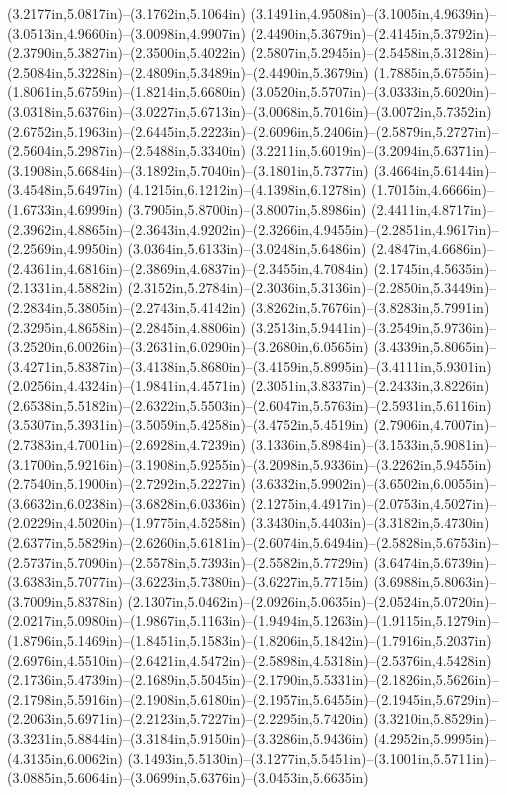 (3.2177in,5.0817in)--(3.1762in,5.1064in) (3.1491in,4.9508in)--(3.1005in,4.9639in)--(3.0513in,4.9660in)--(3.0098in,4.9907in) (2.4490in,5.3679in)--(2.4145in,5.3792in)--(2.3790in,5.3827in)--(2.3500in,5.4022in) (2.5807in,5.2945in)--(2.5458in,5.3128in)--(2.5084in,5.3228in)--(2.4809in,5.3489in)--(2.4490in,5.3679in) (1.7885in,5.6755in)--(1.8061in,5.6759in)--(1.8214in,5.6680in) (3.0520in,5.5707in)--(3.0333in,5.6020in)--(3.0318in,5.6376in)--(3.0227in,5.6713in)--(3.0068in,5.7016in)--(3.0072in,5.7352in) (2.6752in,5.1963in)--(2.6445in,5.2223in)--(2.6096in,5.2406in)--(2.5879in,5.2727in)--(2.5604in,5.2987in)--(2.5488in,5.3340in) (3.2211in,5.6019in)--(3.2094in,5.6371in)--(3.1908in,5.6684in)--(3.1892in,5.7040in)--(3.1801in,5.7377in) (3.4664in,5.6144in)--(3.4548in,5.6497in) (4.1215in,6.1212in)--(4.1398in,6.1278in) (1.7015in,4.6666in)--(1.6733in,4.6999in) (3.7905in,5.8700in)--(3.8007in,5.8986in) (2.4411in,4.8717in)--(2.3962in,4.8865in)--(2.3643in,4.9202in)--(2.3266in,4.9455in)--(2.2851in,4.9617in)--(2.2569in,4.9950in) (3.0364in,5.6133in)--(3.0248in,5.6486in) (2.4847in,4.6686in)--(2.4361in,4.6816in)--(2.3869in,4.6837in)--(2.3455in,4.7084in) (2.1745in,4.5635in)--(2.1331in,4.5882in) (2.3152in,5.2784in)--(2.3036in,5.3136in)--(2.2850in,5.3449in)--(2.2834in,5.3805in)--(2.2743in,5.4142in) (3.8262in,5.7676in)--(3.8283in,5.7991in) (2.3295in,4.8658in)--(2.2845in,4.8806in) (3.2513in,5.9441in)--(3.2549in,5.9736in)--(3.2520in,6.0026in)--(3.2631in,6.0290in)--(3.2680in,6.0565in) (3.4339in,5.8065in)--(3.4271in,5.8387in)--(3.4138in,5.8680in)--(3.4159in,5.8995in)--(3.4111in,5.9301in) (2.0256in,4.4324in)--(1.9841in,4.4571in) (2.3051in,3.8337in)--(2.2433in,3.8226in) (2.6538in,5.5182in)--(2.6322in,5.5503in)--(2.6047in,5.5763in)--(2.5931in,5.6116in) (3.5307in,5.3931in)--(3.5059in,5.4258in)--(3.4752in,5.4519in) (2.7906in,4.7007in)--(2.7383in,4.7001in)--(2.6928in,4.7239in) (3.1336in,5.8984in)--(3.1533in,5.9081in)--(3.1700in,5.9216in)--(3.1908in,5.9255in)--(3.2098in,5.9336in)--(3.2262in,5.9455in) (2.7540in,5.1900in)--(2.7292in,5.2227in) (3.6332in,5.9902in)--(3.6502in,6.0055in)--(3.6632in,6.0238in)--(3.6828in,6.0336in) (2.1275in,4.4917in)--(2.0753in,4.5027in)--(2.0229in,4.5020in)--(1.9775in,4.5258in) (3.3430in,5.4403in)--(3.3182in,5.4730in) (2.6377in,5.5829in)--(2.6260in,5.6181in)--(2.6074in,5.6494in)--(2.5828in,5.6753in)--(2.5737in,5.7090in)--(2.5578in,5.7393in)--(2.5582in,5.7729in) (3.6474in,5.6739in)--(3.6383in,5.7077in)--(3.6223in,5.7380in)--(3.6227in,5.7715in) (3.6988in,5.8063in)--(3.7009in,5.8378in) (2.1307in,5.0462in)--(2.0926in,5.0635in)--(2.0524in,5.0720in)--(2.0217in,5.0980in)--(1.9867in,5.1163in)--(1.9494in,5.1263in)--(1.9115in,5.1279in)--(1.8796in,5.1469in)--(1.8451in,5.1583in)--(1.8206in,5.1842in)--(1.7916in,5.2037in) (2.6976in,4.5510in)--(2.6421in,4.5472in)--(2.5898in,4.5318in)--(2.5376in,4.5428in) (2.1736in,5.4739in)--(2.1689in,5.5045in)--(2.1790in,5.5331in)--(2.1826in,5.5626in)--(2.1798in,5.5916in)--(2.1908in,5.6180in)--(2.1957in,5.6455in)--(2.1945in,5.6729in)--(2.2063in,5.6971in)--(2.2123in,5.7227in)--(2.2295in,5.7420in) (3.3210in,5.8529in)--(3.3231in,5.8844in)--(3.3184in,5.9150in)--(3.3286in,5.9436in) (4.2952in,5.9995in)--(4.3135in,6.0062in) (3.1493in,5.5130in)--(3.1277in,5.5451in)--(3.1001in,5.5711in)--(3.0885in,5.6064in)--(3.0699in,5.6376in)--(3.0453in,5.6635in) 
